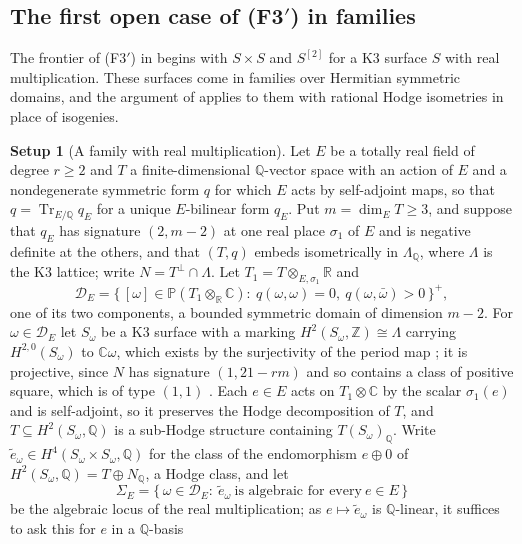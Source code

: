 \documentclass[11pt,reqno]{amsart}
\theoremstyle{plain}
\theoremstyle{definition}
\newtheorem{setupenv}[theorem]{Setup}
\theoremstyle{remark}
\newcommand{\QQ}{\mathbb{Q}}
\newcommand{\ZZ}{\mathbb{Z}}
\newcommand{\RR}{\mathbb{R}}
\newcommand{\CC}{\mathbb{C}}
\newcommand{\PP}{\mathbb{P}}
\newcommand{\cD}{\mathcal{D}}
\DeclareMathOperator{\Tr}{Tr}
\begin{document}
\subsection{The first open case of (F3$'$) in families}\label{ssec:rmlocus}

The frontier of \textup{(F3$'$)} in  begins with
$S\times S$ and $S^{[2]}$ for a K3 surface $S$ with real multiplication. These
surfaces come in families over Hermitian symmetric domains, and the argument
of \cite[Theorem~1.1]{paperI} applies to them with rational Hodge isometries in place of
isogenies.

\begin{setupenv}[A family with real multiplication]\label{setup:rm}
\enlargethispage{2pt}%
Let $E$ be a totally real field of degree $r\ge2$ and $T$ a finite-dimensional
$\QQ$-vector space with an action of $E$ and a nondegenerate symmetric form
$q$ for which $E$ acts by self-adjoint maps, so that $q=\Tr_{E/\QQ}q_{E}$ for
a unique $E$-bilinear form $q_{E}$. Put $m=\dim_{E}T\ge3$, and suppose that
$q_{E}$ has signature $(2,m-2)$ at one real place $\sigma_{1}$ of $E$ and is
negative definite at the others, and that $(T,q)$ embeds isometrically in
$\Lambda_{\QQ}$, where $\Lambda$ is the K3 lattice; write
$N=T^{\perp}\cap\Lambda$. Let $T_{1}=T\otimes_{E,\sigma_{1}}\RR$ and
\[
  \cD_{E}=\{\,[\omega]\in\PP(T_{1}\otimes_{\RR}\CC):\ q(\omega,\omega)=0,\
  q(\omega,\bar\omega)>0\,\}^{+},
\]
one of its two components, a bounded symmetric domain of dimension $m-2$. For
$\omega\in\cD_{E}$ let $S_{\omega}$ be a K3 surface with a marking
$H^{2}(S_{\omega},\ZZ)\cong\Lambda$ carrying $H^{2,0}(S_{\omega})$ to
$\CC\omega$, which exists by the surjectivity of the period map
\cite[Chs.~6--7]{Huy16}; it is projective, since $N$ has signature
$(1,21-rm)$ and so contains a class of positive square, which is of type
$(1,1)$ \cite[Ch.~8]{Huy16}. Each $e\in E$ acts on
$T_{1}\otimes\CC$ by the scalar $\sigma_{1}(e)$ and is self-adjoint, so it
preserves the Hodge decomposition of $T$, and $T\subseteq H^{2}(S_{\omega},\QQ)$
is a sub-Hodge structure containing $T(S_{\omega})_{\QQ}$. Write
$\tilde e_{\omega}\in H^{4}(S_{\omega}\times S_{\omega},\QQ)$ for the class of
the endomorphism $e\oplus0$ of $H^{2}(S_{\omega},\QQ)=T\oplus N_{\QQ}$, a
Hodge class, and let
\[
  \Sigma_{E}=\{\,\omega\in\cD_{E}:\ \tilde e_{\omega}\ \text{is algebraic
  for every}\ e\in E\,\}
\]
be the algebraic locus of the real multiplication; as $e\mapsto\tilde
e_{\omega}$ is $\QQ$-linear, it suffices to ask this for $e$ in a $\QQ$-basis

\end{setupenv}
\end{document}
